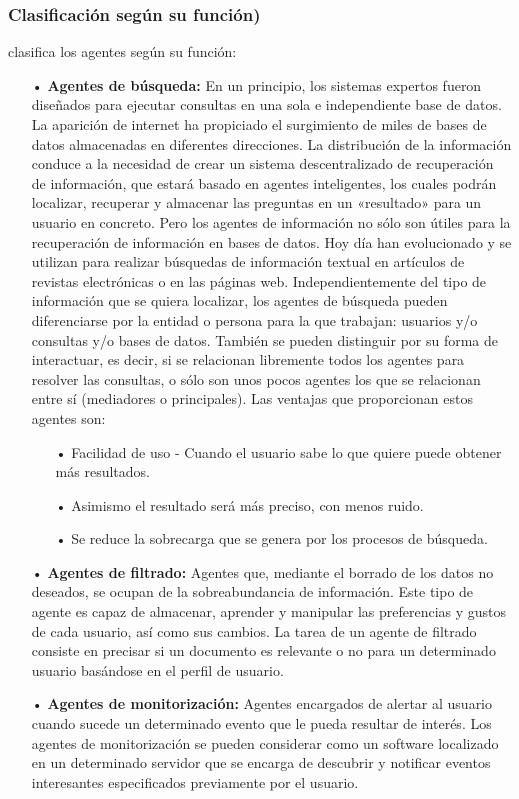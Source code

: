 \subsubsection{Clasificación según su función)}

\cite{Carrascosa} clasifica los agentes según su función:

\begin{itemize}
\item[•] {\bf Agentes de búsqueda:} \vskip 0.1cm
En un principio, los sistemas expertos fueron diseñados para ejecutar consultas en una sola e independiente base de datos. La aparición de internet ha propiciado el surgimiento de miles de bases de datos almacenadas en diferentes direcciones.
\vskip 0.1cm
La distribución de la información conduce a la necesidad de crear un sistema descentralizado de recuperación de información, que estará basado en agentes inteligentes, los cuales podrán localizar, recuperar y almacenar las preguntas en un «resultado» para un usuario en concreto.
\vskip 0.1cm
Pero los agentes de información no sólo son útiles para la recuperación de información en bases de datos. Hoy día han evolucionado y se utilizan para realizar búsquedas de información textual en artículos de revistas electrónicas o en las páginas web. Independientemente del tipo de información que se quiera localizar, los agentes de búsqueda pueden diferenciarse por la entidad o persona para la que trabajan: usuarios y/o consultas y/o bases de datos. También se pueden distinguir por su forma de interactuar, es decir, si se relacionan libremente todos los agentes para resolver las consultas, o sólo son unos pocos agentes los que se relacionan entre sí (mediadores o principales).
\vskip 0.1cm
Las ventajas que proporcionan estos agentes son:
\begin{itemize}
\item[•] Facilidad de uso - Cuando el usuario sabe lo que quiere puede obtener más resultados.
\item[•] Asimismo el resultado será más preciso, con menos ruido.
\item[•] Se reduce la sobrecarga que se genera por los procesos de búsqueda.
\end{itemize}

\item[•] {\bf Agentes de filtrado:} \vskip 0.1cm
Agentes que, mediante el borrado de los datos no deseados, se ocupan de la sobreabundancia de información. Este tipo de agente es capaz de almacenar, aprender y manipular las preferencias y gustos de cada usuario, así como sus cambios. La tarea de un agente de filtrado consiste en precisar si un documento es relevante o no para un determinado usuario basándose en el perfil de usuario.

\item[•] {\bf Agentes de monitorización:} \vskip 0.1cm
Agentes encargados de alertar al usuario cuando sucede un determinado evento que le pueda resultar de interés. Los agentes de monitorización se pueden considerar como un software localizado en un determinado servidor que se encarga de descubrir y notificar eventos interesantes especificados previamente por el usuario.

\end{itemize}

